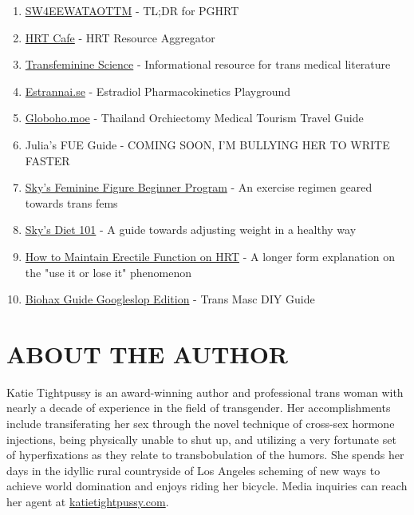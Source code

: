 \documentclass{article}
\begin{document}
\begin{enumerate}
  \item \href{https://startwith4mgestradiolenanthateweeklyandtestatonetothreemonths.com/}{SW4EEWATAOTTM} - TL;DR for PGHRT
  \item \href{https://hrtcafe.net/}{HRT Cafe} - HRT Resource Aggregator
  \item \href{https://transfemscience.org/}{Transfeminine Science} - Informational resource for trans medical literature
  \item \href{http://estrannai.se}{Estrannai.se} - Estradiol Pharmacokinetics Playground
  \item \href{https://globoho.moe/}{Globoho.moe} - Thailand Orchiectomy Medical Tourism Travel Guide 
  \item Julia's FUE Guide - COMING SOON, I'M BULLYING HER TO WRITE FASTER
  \item \href{https://docs.google.com/document/d/1-NyE5EY5TTaRRMhk7HlTbKJ7HifjEsA4jlDO1qKQVl0/edit?tab=t.0}{Sky's Feminine Figure Beginner Program} - An exercise regimen geared towards trans fems
  \item \href{https://docs.google.com/document/d/114sztSw1aVWM2pXLDl9NrHklyvewz3EmFiHiisjM71k/edit?tab=t.0}{Sky's Diet 101} - A guide towards adjusting weight in a healthy way
  \item \href{https://stainedglasswoman.substack.com/p/how-to-maintain-your-penis-function}{How to Maintain Erectile Function on HRT} - A longer form explanation on the "use it or lose it" phenomenon
  \item \href{https://docs.google.com/document/d/1DXFxzN0XTudPZez_SO61fpqncRLPH_Be_QG_8Pcz9LU/edit?pli=1&tab=t.0}{Biohax Guide Googleslop Edition} - Trans Masc DIY Guide
\end{enumerate}

\section*{ABOUT THE AUTHOR}

Katie Tightpussy is an award-winning author and professional trans woman with nearly a decade of experience in the field of transgender. Her accomplishments include transiferating her sex through the novel technique of cross-sex hormone injections, being physically unable to shut up, and utilizing a very fortunate set of hyperfixations as they relate to transbobulation of the humors. She spends her days in the idyllic rural countryside of Los Angeles scheming of new ways to achieve world domination and enjoys riding her bicycle. Media inquiries can reach her agent at \href{http://katietightpussy.com}{katietightpussy.com}.
\end{document}
